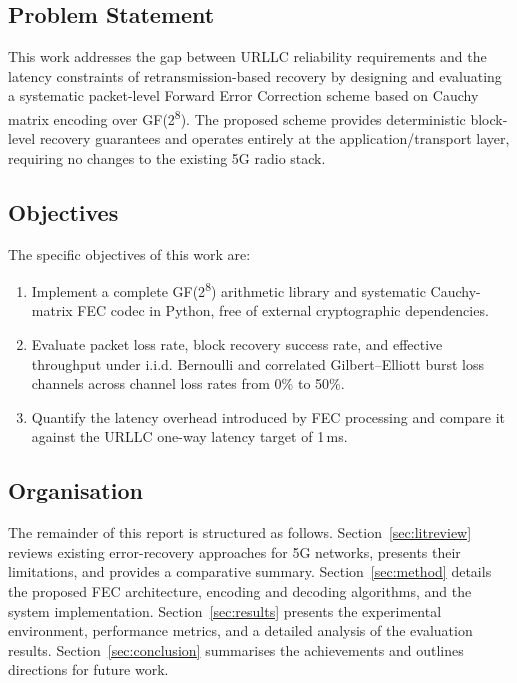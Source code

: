 \documentclass[conference]{IEEEtran}
\begin{document}
\subsection{Problem Statement}

This work addresses the gap between URLLC reliability requirements and
the latency constraints of retransmission-based recovery by designing
and evaluating a systematic packet-level Forward Error Correction scheme
based on Cauchy matrix encoding over GF(2\textsuperscript{8}). The
proposed scheme provides deterministic block-level recovery guarantees
and operates entirely at the application/transport layer, requiring no
changes to the existing 5G radio stack.

\subsection{Objectives}

The specific objectives of this work are:
\begin{enumerate}
  \item Implement a complete GF(2\textsuperscript{8}) arithmetic library
        and systematic Cauchy-matrix FEC codec in Python, free of
        external cryptographic dependencies.
  \item Evaluate packet loss rate, block recovery success rate, and
        effective throughput under i.i.d. Bernoulli and correlated
        Gilbert--Elliott burst loss channels across channel loss rates
        from 0\% to 50\%.
  \item Quantify the latency overhead introduced by FEC processing and
        compare it against the URLLC one-way latency target of 1\,ms.
\end{enumerate}

\subsection{Organisation}

The remainder of this report is structured as follows.
Section~\ref{sec:litreview} reviews existing error-recovery approaches
for 5G networks, presents their limitations, and provides a comparative
summary. Section~\ref{sec:method} details the proposed FEC architecture,
encoding and decoding algorithms, and the system implementation.
Section~\ref{sec:results} presents the experimental environment,
performance metrics, and a detailed analysis of the evaluation results.
Section~\ref{sec:conclusion} summarises the achievements and outlines
directions for future work.
\end{document}
